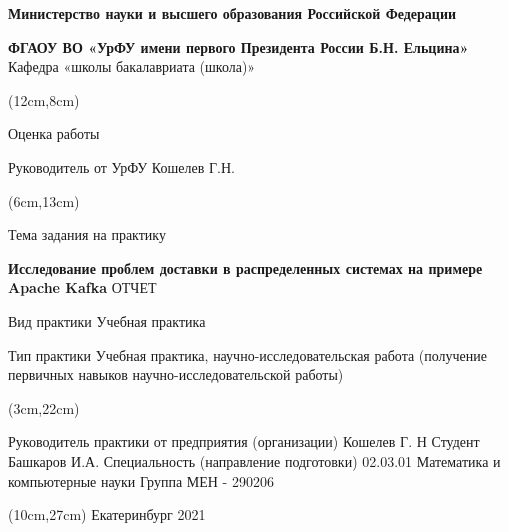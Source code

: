 \documentclass[11pt]{article}
\begin{document}
    \begin{center}
        \textbf{Министерство науки и высшего образования Российской Федерации}

        \textbf{ФГАОУ ВО «УрФУ имени первого Президента России Б.Н. Ельцина»}
        Кафедра «школы бакалавриата (школа)»
    \end{center}
    \begin{textblock*}{10cm}(12cm,8cm)
            \begin{center}
                Оценка работы \underline{\hspace{1cm}}

                Руководитель от УрФУ Кошелев Г.Н.
            \end{center}
    \end{textblock*}
    \begin{textblock*}{10cm}(6cm,13cm)

        \begin{center}
        Тема задания на практику
        \linebreak

        \textbf{Исследование проблем доставки в распределенных системах на примере Apache Kafka}
        \linebreak
        \linebreak
        ОТЧЕТ

        Вид практики Учебная практика

        Тип практики Учебная практика, научно-исследовательская работа (получение
        первичных навыков научно-исследовательской работы)
        \end{center}
    \end{textblock*}
    \begin{textblock*}{16cm}(3cm,22cm)


        \begin{flushleft}
            Руководитель практики от предприятия (организации) Кошелев Г. Н
            \linebreak\linebreak
            Студент Башкаров И.А.
            \linebreak\linebreak
            Специальность (направление подготовки) 02.03.01 Математика и компьютерные
            науки
            \linebreak\linebreak
            Группа МЕН - 290206
            \end {flushleft}
    \end{textblock*}
    \begin{textblock*}{16cm}(10cm,27cm)
        Екатеринбург 2021
    \end{textblock*}
    \pagebreak
    \pagestyle{plain} %
\end{document}
